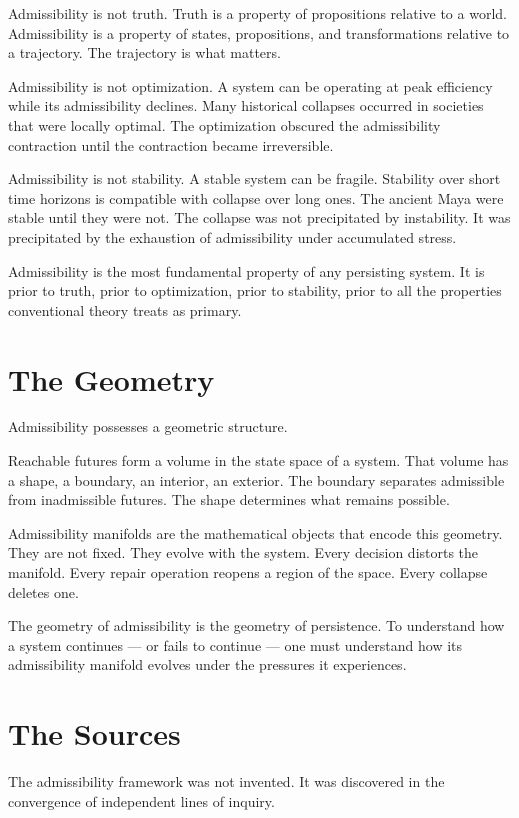 \documentclass[12pt, openany]{book}
\begin{document}
Admissibility is not truth. Truth is a property of propositions relative to
a world. Admissibility is a property of states, propositions, and
transformations relative to a trajectory. The trajectory is what matters.

Admissibility is not optimization. A system can be operating at peak
efficiency while its admissibility declines. Many historical collapses
occurred in societies that were locally optimal. The optimization obscured
the admissibility contraction until the contraction became irreversible.

Admissibility is not stability. A stable system can be fragile. Stability
over short time horizons is compatible with collapse over long ones. The
ancient Maya were stable until they were not. The collapse was not
precipitated by instability. It was precipitated by the exhaustion of
admissibility under accumulated stress.

Admissibility is the most fundamental property of any persisting system.
It is prior to truth, prior to optimization, prior to stability, prior to
all the properties conventional theory treats as primary.

\section{The Geometry}

Admissibility possesses a geometric structure.

Reachable futures form a volume in the state space of a system. That
volume has a shape, a boundary, an interior, an exterior. The boundary
separates admissible from inadmissible futures. The shape determines what
remains possible.

Admissibility manifolds are the mathematical objects that encode this
geometry. They are not fixed. They evolve with the system. Every decision
distorts the manifold. Every repair operation reopens a region of the
space. Every collapse deletes one.

The geometry of admissibility is the geometry of persistence. To understand
how a system continues — or fails to continue — one must understand how
its admissibility manifold evolves under the pressures it experiences.

\section{The Sources}

The admissibility framework was not invented. It was discovered in the
convergence of independent lines of inquiry.
\end{document}
